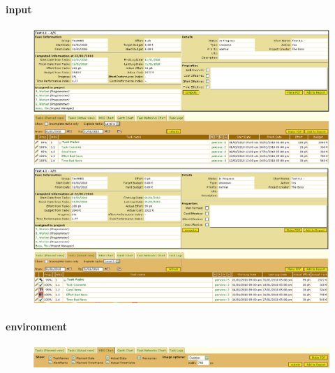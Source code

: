 \paragraph{input}
\begin{figure}
\centering
\includegraphics[width=\textwidth]{tests/TEST_WBS/4.1/4.1_4_5/Esempio_1/input.png}
\includegraphics[width=\textwidth]{tests/TEST_WBS/4.1/4.1_4_5/Esempio_1/input_actual.png}
\end{figure}
\paragraph{environment}
\begin{figure}
\centering
\includegraphics[width=\textwidth]{tests/TEST_WBS/4.1/4.1_4_5/Esempio_1/environment.png}
\end{figure}
